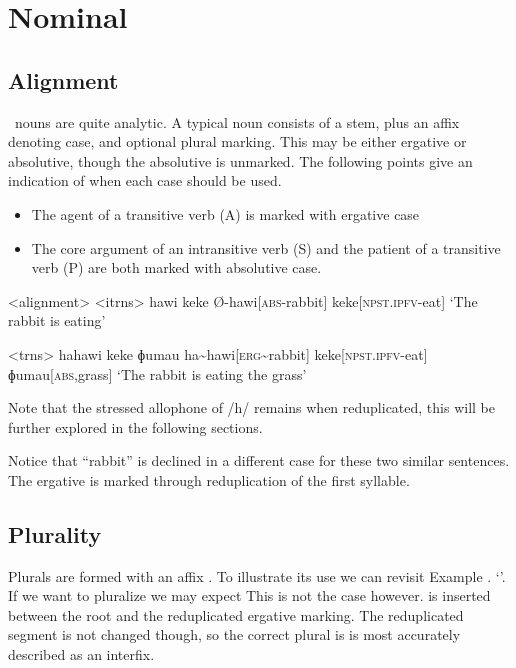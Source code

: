\chapter{Nominal}
\section{Alignment}

\langname\ nouns are quite analytic.
A typical noun consists of a stem, plus an affix denoting case, and optional plural marking.
This may be either ergative or absolutive, though the absolutive is unmarked.
The following points give an indication of when each case should be used.
\begin{itemize}
  \item The agent of a transitive verb (A) is marked with ergative case
  \item The core argument of an intransitive verb (S) and the patient of a transitive verb (P) are both marked with absolutive case.
\end{itemize}

\pex<alignment>
\a<itrns>
\begingl
\glpreamble hawi keke
\endpreamble
Ø-hawi[\textsc{abs-}rabbit]
keke[\textsc{npst.ipfv-}eat]
\glft `The rabbit is eating'
\endgl

\a<trns>
\begingl
\glpreamble hahawi keke ɸumau
\endpreamble
ha\textasciitilde hawi[\textsc{erg\textasciitilde}rabbit]
keke[\textsc{npst.ipfv-}eat]
ɸumau[\textsc{abs,}grass]
\glft `The rabbit is eating the grass'
\endgl
\xe

Note that the stressed allophone of /h/ remains when reduplicated, this will be further explored in the following sections.

Notice that ``rabbit'' is declined in a different case for these two similar sentences.
The ergative is marked through reduplication of the first syllable.

\section{Plurality}

Plurals are formed with an affix .
To illustrate its use we can revisit Example .
`'.
If we want to pluralize  we may expect  This is not the case however.
 is inserted between the root and the reduplicated ergative marking.
The reduplicated segment is not changed though, so the correct plural is   is most accurately described as an interfix.

